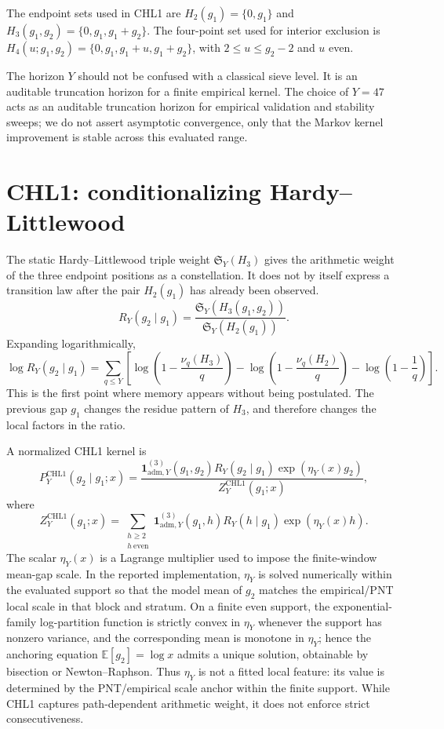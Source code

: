 \documentclass[10pt]{article}
\newcommand{\SY}{\mathfrak{S}_Y}
\newcommand{\CHLone}{\mathrm{CHL1}}
\begin{document}
The endpoint sets used in CHL1 are $H_2(g_1)=\{0,g_1\}$ and $H_3(g_1,g_2)=\{0,g_1,g_1+g_2\}$. The four-point set used for interior exclusion is $H_4(u;g_1,g_2)=\{0,g_1,g_1+u,g_1+g_2\}$, with $2\le u\le g_2-2$ and $u$ even.

The horizon $Y$ should not be confused with a classical sieve level. It is an auditable truncation horizon for a finite empirical kernel. The choice of $Y=47$ acts as an auditable truncation horizon for empirical validation and stability sweeps; we do not assert asymptotic convergence, only that the Markov kernel improvement is stable across this evaluated range.
\section{CHL1: conditionalizing Hardy--Littlewood}
The static Hardy--Littlewood triple weight $\SY(H_3)$ gives the arithmetic weight of the three endpoint positions as a constellation. It does not by itself express a transition law after the pair $H_2(g_1)$ has already been observed.
\[
R_Y(g_2\mid g_1)=\frac{\SY(H_3(g_1,g_2))}{\SY(H_2(g_1))}.
\]
Expanding logarithmically,
\[
\log R_Y(g_2\mid g_1)=\sum_{q\le Y}\left[\log\left(1-\frac{\nu_q(H_3)}{q}\right)-\log\left(1-\frac{\nu_q(H_2)}{q}\right)-\log\left(1-\frac{1}{q}\right)\right].
\]
This is the first point where memory appears without being postulated. The previous gap $g_1$ changes the residue pattern of $H_3$, and therefore changes the local factors in the ratio.

A normalized CHL1 kernel is
\[
P_Y^{\CHLone}(g_2\mid g_1;x)=\frac{\mathbf{1}_{\mathrm{adm},Y}^{(3)}(g_1,g_2)R_Y(g_2\mid g_1)\exp(\eta_Y(x)g_2)}{Z_Y^{\CHLone}(g_1;x)},
\]
where
\[
Z_Y^{\CHLone}(g_1;x)=\sum_{\substack{h\ge 2\\h\ \mathrm{even}}}\mathbf{1}_{\mathrm{adm},Y}^{(3)}(g_1,h)R_Y(h\mid g_1)\exp(\eta_Y(x)h).
\]
The scalar $\eta_Y(x)$ is a Lagrange multiplier used to impose the finite-window mean-gap scale. In the reported implementation, $\eta_Y$ is solved numerically within the evaluated support so that the model mean of $g_2$ matches the empirical/PNT local scale in that block and stratum. On a finite even support, the exponential-family log-partition function is strictly convex in $\eta_Y$ whenever the support has nonzero variance, and the corresponding mean is monotone in $\eta_Y$; hence the anchoring equation $\mathbb E[g_2]=\log x$ admits a unique solution, obtainable by bisection or Newton--Raphson. Thus $\eta_Y$ is not a fitted local feature: its value is determined by the PNT/empirical scale anchor within the finite support. While CHL1 captures path-dependent arithmetic weight, it does not enforce strict consecutiveness.
\end{document}
